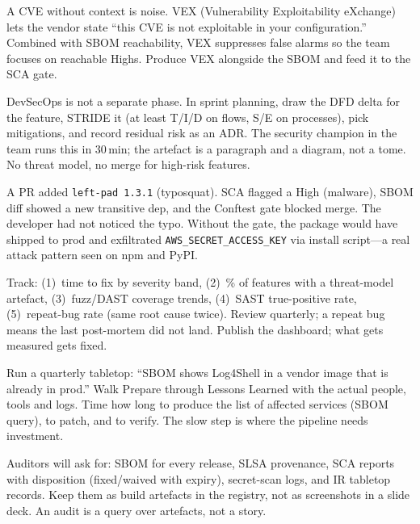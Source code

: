 \begin{remark}
A CVE without context is noise. VEX (Vulnerability Exploitability eXchange) lets the vendor state ``this CVE is not exploitable in your configuration.'' Combined with SBOM reachability, VEX suppresses false alarms so the team focuses on reachable Highs. Produce VEX alongside the SBOM and feed it to the SCA gate.
\end{remark}

\begin{remark}
DevSecOps is not a separate phase. In sprint planning, draw the DFD delta for the feature, STRIDE it (at least T/I/D on flows, S/E on processes), pick mitigations, and record residual risk as an ADR. The security champion in the team runs this in 30\,min; the artefact is a paragraph and a diagram, not a tome. No threat model, no merge for high-risk features.
\end{remark}

\begin{example}
A PR added \texttt{left-pad 1.3.1} (typosquat). SCA flagged a High (malware), SBOM diff showed a new transitive dep, and the Conftest gate blocked merge. The developer had not noticed the typo. Without the gate, the package would have shipped to prod and exfiltrated \texttt{AWS\_SECRET\_ACCESS\_KEY} via install script---a real attack pattern seen on npm and PyPI.
\end{example}

\begin{remark}
Track: (1)~time to fix by severity band, (2)~\% of features with a threat-model artefact, (3)~fuzz/DAST coverage trends, (4)~SAST true-positive rate, (5)~repeat-bug rate (same root cause twice). Review quarterly; a repeat bug means the last post-mortem did not land. Publish the dashboard; what gets measured gets fixed.
\end{remark}

\begin{remark}
Run a quarterly tabletop: ``SBOM shows Log4Shell in a vendor image that is already in prod.'' Walk Prepare through Lessons Learned with the actual people, tools and logs. Time how long to produce the list of affected services (SBOM query), to patch, and to verify. The slow step is where the pipeline needs investment.
\end{remark}

\begin{remark}
Auditors will ask for: SBOM for every release, SLSA provenance, SCA reports with disposition (fixed/waived with expiry), secret-scan logs, and IR tabletop records. Keep them as build artefacts in the registry, not as screenshots in a slide deck. An audit is a query over artefacts, not a story.
\end{remark}

